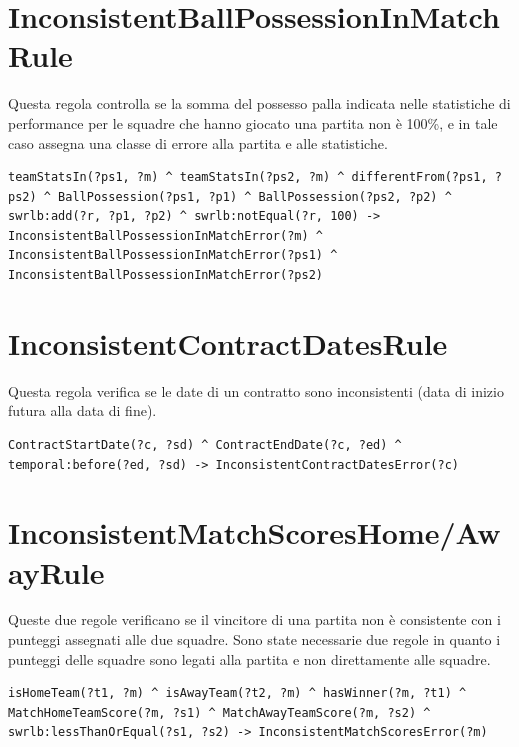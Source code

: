 \documentclass[11pt]{report} %
\begin{document}
\begin{itemize}[leftmargin=*]
\section{InconsistentBallPossessionInMatchRule}

Questa regola controlla se la somma del possesso palla indicata nelle statistiche di performance per le squadre che hanno giocato una partita non è 100\%, e in tale caso assegna una classe di errore alla partita e alle statistiche.

\begin{lstlisting}[language=SWRL]
teamStatsIn(?ps1, ?m) ^ teamStatsIn(?ps2, ?m) ^ differentFrom(?ps1, ?ps2) ^ BallPossession(?ps1, ?p1) ^ BallPossession(?ps2, ?p2) ^ swrlb:add(?r, ?p1, ?p2) ^ swrlb:notEqual(?r, 100) -> InconsistentBallPossessionInMatchError(?m) ^ InconsistentBallPossessionInMatchError(?ps1) ^ InconsistentBallPossessionInMatchError(?ps2)
\end{lstlisting}

\section{InconsistentContractDatesRule}

Questa regola verifica se le date di un contratto sono inconsistenti (data di inizio futura alla data di fine).

\begin{lstlisting}[language=SWRL]
ContractStartDate(?c, ?sd) ^ ContractEndDate(?c, ?ed) ^ temporal:before(?ed, ?sd) -> InconsistentContractDatesError(?c)
\end{lstlisting}

\section{InconsistentMatchScoresHome/AwayRule}

Queste due regole verificano se il vincitore di una partita non è consistente con i punteggi assegnati alle due squadre.
Sono state necessarie due regole in quanto i punteggi delle squadre sono legati alla partita e non direttamente alle squadre.

\begin{lstlisting}[language=SWRL]
isHomeTeam(?t1, ?m) ^ isAwayTeam(?t2, ?m) ^ hasWinner(?m, ?t1) ^ MatchHomeTeamScore(?m, ?s1) ^ MatchAwayTeamScore(?m, ?s2) ^ swrlb:lessThanOrEqual(?s1, ?s2) -> InconsistentMatchScoresError(?m)
\end{lstlisting}


\end{itemize}
\end{document}
